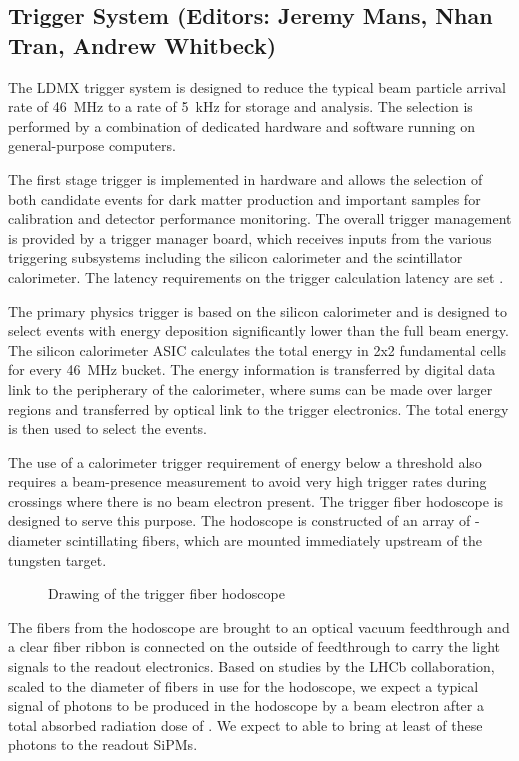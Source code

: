 
\subsection{Trigger System (Editors: Jeremy Mans, Nhan Tran, Andrew Whitbeck)}

The LDMX trigger system is designed to reduce the typical beam
particle arrival rate of 46~MHz to a rate of 5~kHz for storage and
analysis.  The selection is performed by a combination of dedicated
hardware and software running on general-purpose computers.

The first stage trigger is implemented in hardware and allows the
selection of both candidate events for dark matter production and
important samples for calibration and detector performance monitoring.
The overall trigger management is provided by a trigger manager board,
which receives inputs from the various triggering subsystems including
the silicon calorimeter and the scintillator calorimeter.  The latency
requirements on the trigger calculation latency are set .

The primary physics trigger is based on the silicon calorimeter and is
designed to select events with energy deposition significantly lower
than the full beam energy.  The silicon calorimeter ASIC calculates
the total energy in 2x2 fundamental cells for every 46~MHz bucket.
The energy information is transferred by digital data link to the
peripherary of the calorimeter, where sums can be made over larger
regions and transferred by optical link to the trigger electronics.
The total energy is then used to select the events.

The use of a calorimeter trigger requirement of energy below a
threshold also requires a beam-presence measurement to avoid very high
trigger rates during crossings where there is no beam electron
present.  The trigger fiber hodoscope is designed to serve this
purpose.  The hodoscope is constructed of an array of
-diameter scintillating fibers, which are mounted
immediately upstream of the tungsten target. 

\begin{figure}[t]
  \caption{Drawing of the trigger fiber hodoscope}
\end{figure}

The fibers from the hodoscope are brought to an optical vacuum
feedthrough and a clear fiber ribbon is connected on the outside of
feedthrough to carry the light signals to the readout electronics.
Based on studies by the LHCb collaboration\cite{lhcb:scintfiberrad},
scaled to the diameter of fibers in use for the hodoscope, we expect a
typical signal of \draft{[]} photons to be produced in the hodoscope
by a beam electron after a total absorbed radiation dose of .  We expect to able to bring at least \draft{[50\%]} of these
photons to the readout SiPMs.

